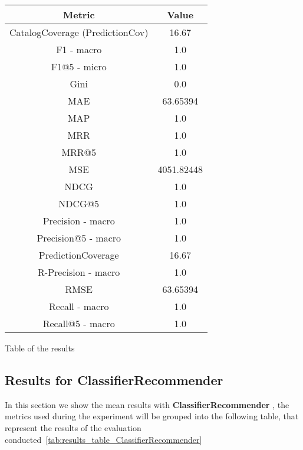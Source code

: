 \documentclass[11pt]{article}
\begin{document}
\begin{center}
    \begin{tabular}{|c|c|}
        \hline
        \textbf{Metric} & \textbf{Value} \\ \hline
                CatalogCoverage (PredictionCov) & 16.67 \\ \hline
                F1 - macro & 1.0 \\ \hline
                F1@5 - micro & 1.0 \\ \hline
                Gini & 0.0 \\ \hline
                MAE & 63.65394 \\ \hline
                MAP & 1.0 \\ \hline
                MRR & 1.0 \\ \hline
                MRR@5 & 1.0 \\ \hline
                MSE & 4051.82448 \\ \hline
                NDCG & 1.0 \\ \hline
                NDCG@5 & 1.0 \\ \hline
                Precision - macro & 1.0 \\ \hline
                Precision@5 - macro & 1.0 \\ \hline
                PredictionCoverage & 16.67 \\ \hline
                R-Precision - macro & 1.0 \\ \hline
                RMSE & 63.65394 \\ \hline
                Recall - macro & 1.0 \\ \hline
                Recall@5 - macro & 1.0 \\ \hline
             \end{tabular}
    \captionsetup{type=table}
    \caption{Table of the results}
    \label{tab:results_table_IndexQuery}
\end{center}
\hfill\break
\hfill\break




\subsection{Results for ClassifierRecommender}\label{subsec:ClassifierRecommender}
In this section we show the mean results with \textbf{ ClassifierRecommender }, the metrics used during the experiment will be
grouped into the following table, that represent the results of the evaluation conducted~\ref{tab:results_table_ClassifierRecommender}
\end{document}
